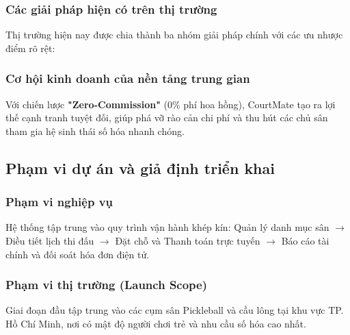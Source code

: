 \subsubsection{Các giải pháp hiện có trên thị trường}
Thị trường hiện nay được chia thành ba nhóm giải pháp chính với các ưu nhược điểm rõ rệt:

\subsubsection{Cơ hội kinh doanh của nền tảng trung gian}
Với chiến lược \textbf{"Zero-Commission"} (0\% phí hoa hồng), CourtMate tạo ra lợi thế cạnh tranh tuyệt đối, giúp phá vỡ rào cản chi phí và thu hút các chủ sân tham gia hệ sinh thái số hóa nhanh chóng.

\subsection{Phạm vi dự án và giả định triển khai}
\subsubsection{Phạm vi nghiệp vụ}
Hệ thống tập trung vào quy trình vận hành khép kín: Quản lý danh mục sân $\rightarrow$ Điều tiết lịch thi đấu $\rightarrow$ Đặt chỗ và Thanh toán trực tuyến $\rightarrow$ Báo cáo tài chính và đối soát hóa đơn điện tử.

\subsubsection{Phạm vi thị trường (Launch Scope)}
Giai đoạn đầu tập trung vào các cụm sân Pickleball và cầu lông tại khu vực TP. Hồ Chí Minh, nơi có mật độ người chơi trẻ và nhu cầu số hóa cao nhất.

